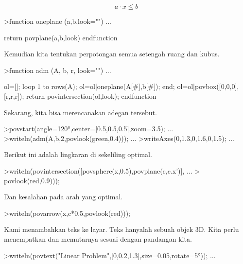 \documentclass[a4paper,10pt]{article}
\begin{document}
\begin{eulernotebook}
\begin{eulercomment}
\begin{eulercomment}
\begin{eulercomment}
\begin{eulercomment}
\begin{eulercomment}
\begin{eulercomment}
\begin{eulercomment}
\begin{eulercomment}
\begin{eulercomment}
\begin{eulercomment}
\begin{eulercomment}
\begin{eulercomment}
\begin{eulercomment}
\begin{eulercomment}
\begin{eulercomment}
\begin{eulercomment}
\begin{eulercomment}
\end{eulercomment}
\begin{eulerformula}
\[
a \cdot x \le b
\]
\end{eulerformula}
\begin{eulerprompt}
>function oneplane (a,b,look="") ...
\end{eulerprompt}
\begin{eulerudf}
    return povplane(a,b,look)
  endfunction
\end{eulerudf}
\begin{eulercomment}
Kemudian kita tentukan perpotongan semua setengah ruang dan kubus.
\end{eulercomment}
\begin{eulerprompt}
>function adm (A, b, r, look="") ...
\end{eulerprompt}
\begin{eulerudf}
    ol=[];
    loop 1 to rows(A); ol=ol|oneplane(A[#],b[#]); end;
    ol=ol|povbox([0,0,0],[r,r,r]);
    return povintersection(ol,look);
  endfunction
\end{eulerudf}
\begin{eulercomment}
Sekarang, kita bisa merencanakan adegan tersebut.
\end{eulercomment}
\begin{eulerprompt}
>povstart(angle=120°,center=[0.5,0.5,0.5],zoom=3.5); ...
>writeln(adm(A,b,2,povlook(green,0.4))); ...
>writeAxes(0,1.3,0,1.6,0,1.5); ...
\end{eulerprompt}
\begin{eulercomment}
Berikut ini adalah lingkaran di sekeliling optimal.
\end{eulercomment}
\begin{eulerprompt}
>writeln(povintersection([povsphere(x,0.5),povplane(c,c.x')], ...
>  povlook(red,0.9)));
\end{eulerprompt}
\begin{eulercomment}
Dan kesalahan pada arah yang optimal.
\end{eulercomment}
\begin{eulerprompt}
>writeln(povarrow(x,c*0.5,povlook(red)));
\end{eulerprompt}
\begin{eulercomment}
Kami menambahkan teks ke layar. Teks hanyalah sebuah objek 3D. Kita
perlu menempatkan dan memutarnya sesuai dengan pandangan kita.
\end{eulercomment}
\begin{eulerprompt}
>writeln(povtext("Linear Problem",[0,0.2,1.3],size=0.05,rotate=5°)); ...

\end{eulerprompt}
\end{eulercomment}
\end{eulercomment}
\end{eulercomment}
\end{eulercomment}
\end{eulercomment}
\end{eulercomment}
\end{eulercomment}
\end{eulercomment}
\end{eulercomment}
\end{eulercomment}
\end{eulercomment}
\end{eulercomment}
\end{eulercomment}
\end{eulercomment}
\end{eulercomment}
\end{eulercomment}
\end{eulernotebook}
\end{document}
